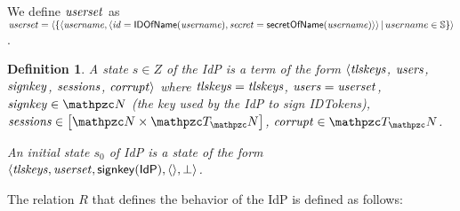 \documentclass[letterpaper,onecolumn,10pt]{article}
\newtheorem{definition}{Definition}
\begin{document}
We define $\mathit{userset}$ as $\mathit{userset} = \langle\{\langle\mathit{username}, \langle {{}\mathit{id}=\mathsf{IDOfName}(\mathit{username}), \mathit{secret}=\mathsf{secretOfName}(\mathit{username})} \rangle\rangle\, |\, username \in \mathbb{S}\}\rangle$.

\begin{definition}\label{def:initial-state-idp}
  A \emph{state $s\in Z$ of the IdP} is a term of the form
  $\langle\mathit{tlskeys}$, $\mathit{users}$, $\mathit{signkey}$,
  $\mathit{sessions}$, $\mathit{corrupt}\rangle$ where 
  $\mathit{tlskeys} = \mathit{tlskeys} $, 
  $\mathit{users} = \mathit{userset}$, 
  $\mi{signkey} \in \nonces$ 
  (the key used by the IdP to sign IDTokens),
  $\mi{sessions}\in\dict{\nonces}{\terms}$, $\mi{corrupt} \in \terms$.

  An \emph{initial state $s_0$ of IdP} is a state of the form 
  $\langle\mathit{tlskeys}, \mathit{userset}, \mathsf{signkey}(\mathsf{IdP}), \langle\rangle, \bot\rangle$.
\end{definition}

The relation $R$ that defines the behavior of the IdP is defined as follows:
\end{document}
